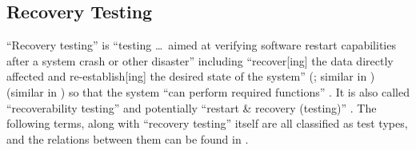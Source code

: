 \subsection{Recovery Testing}
\label{recov-flaw}

``Recovery testing'' is ``testing \dots\ aimed at verifying
software restart capabilities after a system crash or other disaster''
\citep[p.~5-9]{SWEBOK2024} including ``recover[ing] the data directly affected
and re-establish[ing] the desired state of the system''
\ifnotpaper
    (\citealp{ISO_IEC2023a}; similar in \citealp[p.~7-10]{SWEBOK2024})
\else
    \cite{ISO_IEC2023a} (similar in \cite[p.~7-10]{SWEBOK2024})
\fi
so that the system ``can perform required functions'' \citep[p.~370]{IEEE2017}.
It is also called ``recoverability testing'' \cite[p.~47]{Kam2008} and
potentially ``restart \& recovery (testing)'' \cite[Fig.~5]{Gerrard2000a}.
The following terms, along with ``recovery testing'' itself
\citep[p.~22]{IEEE2022} are all classified as test types, and the relations
between them can be found in .

